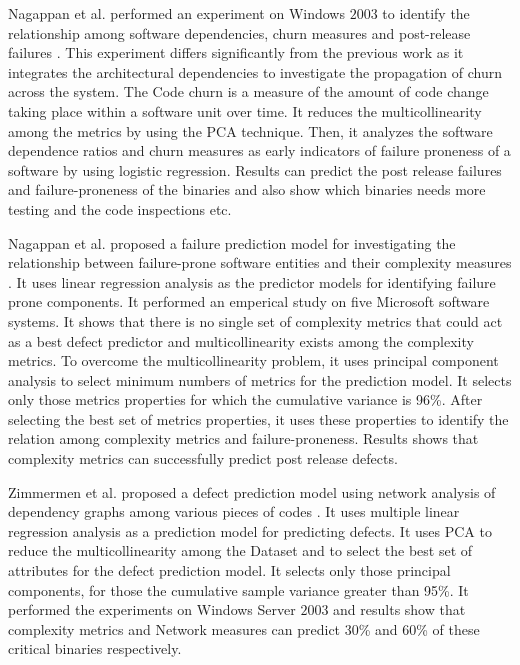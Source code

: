 \documentclass[12pt]{report}
\begin{document}


Nagappan et al. performed an experiment on Windows $2003$ to identify the relationship among software dependencies, churn measures and post-release failures \cite{nagappan2005use,nagappan2007using}. This experiment differs significantly from the previous work as it integrates the architectural dependencies to investigate the propagation of churn across the system. The Code churn is a measure of the amount of code change taking place within a software unit over time. It reduces the multicollinearity among the metrics by using the PCA technique. Then, it analyzes the software dependence ratios and churn measures as early indicators of failure proneness of a software by using logistic regression. Results can predict the post release failures and failure-proneness of the binaries and also show which binaries needs more testing and the code inspections etc.



Nagappan et al. proposed a failure prediction model for investigating the relationship between failure-prone software entities and their complexity measures \cite{nagappan2006mining}. It uses linear regression analysis as the predictor models for identifying failure prone components. It performed an emperical study on five Microsoft software systems. It shows that there is no single set of complexity metrics that could act as a best defect predictor and multicollinearity exists among the complexity metrics. To overcome the multicollinearity problem, it uses principal component analysis to select minimum numbers of metrics for the prediction model. It selects only those metrics properties for which the cumulative variance is 96\%. After selecting the best set of metrics properties, it uses these properties to identify the relation among complexity metrics and failure-proneness. Results shows that complexity metrics can successfully predict post release defects. 



Zimmermen et al. proposed a defect prediction model using network analysis of dependency graphs among various pieces of codes \cite{zimmermann2008predicting}. It uses multiple linear regression analysis as a prediction model for predicting defects. It uses PCA to reduce the multicollinearity among the Dataset and to select the best set of attributes for the defect prediction model. It selects only those principal components, for those the cumulative sample variance greater than 95\%. It performed the experiments on Windows Server $2003$ and results show that complexity metrics and Network measures can predict 30\% and 60\% of these critical binaries respectively.  
\end{document}
